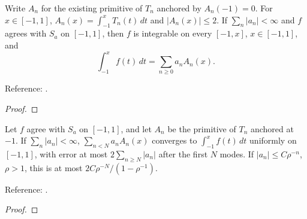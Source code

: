 \begin{theorem}
\label{thm:chebyshev-anchored-series-integral}
\leanok
Write $A_n$ for the existing primitive of $T_n$ anchored by $A_n(-1)=0$.
For $x\in[-1,1]$, $A_n(x)=\int_{-1}^xT_n(t)\,dt$ and $|A_n(x)|\le2$.
If $\sum_n|a_n|<\infty$ and $f$ agrees with $S_a$ on $[-1,1]$, then
$f$ is integrable on every $[-1,x]$, $x\in[-1,1]$, and
\[
 \int_{-1}^x f(t)\,dt=\sum_{n\ge0}a_n A_n(x).
\]


Reference: \cite[Chapters 19 and 21]{atap}.
\end{theorem}
\begin{proof}
\leanok
\end{proof}

\begin{theorem}
\label{thm:chebyshev-anchored-series-error}
\leanok
Let $f$ agree with $S_a$ on $[-1,1]$, and let $A_n$ be the primitive of $T_n$ anchored at $-1$. If $\sum_n|a_n|<\infty$, $\sum_{n<N}a_n A_n(x)$ converges to $\int_{-1}^x f(t)\,dt$ uniformly on
$[-1,1]$, with error at most
$2\sum_{n\ge N}|a_n|$ after the first $N$ modes. If $|a_n|\le C\rho^{-n}$,
$\rho>1$, this is at most $2C\rho^{-N}/(1-\rho^{-1})$.

Reference: \cite[Chapter 21]{atap}.
\end{theorem}
\begin{proof}
\leanok
\end{proof}

